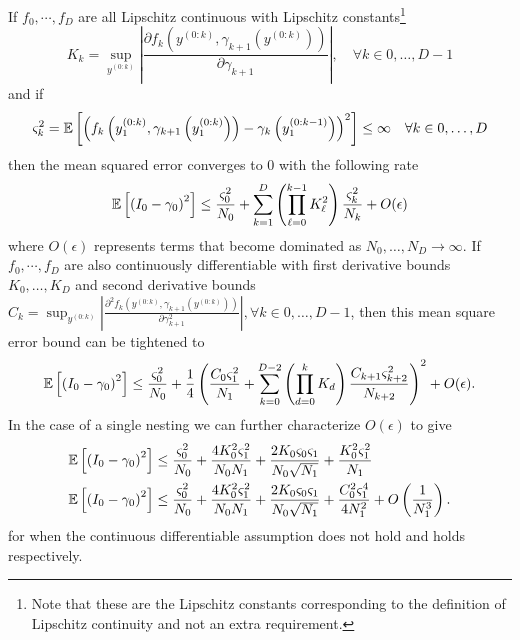 \begin{theorem}
  If $f_0, \cdots, f_D$ are all Lipschitz continuous with Lipschitz 
  constants\footnote{Note that these are the Lipschitz constants corresponding to
  	the definition of Lipschitz continuity and not an extra requirement.}
  \[K_k = \sup_{y^{(0:k)}} \left| \frac{\partial f_k\left(y^{(0:k)},\gamma_{k+1}(y^{(0:k)})\right)}{\partial \gamma_{k+1}}\right|, \quad \forall k
  \in 0,\dots,D-1
  \]
  and if 
    \[
    \varsigma_{k}^2  
    =\mathbb{E} \left[\left(f_k\left(y_1^{(0:k)},\gamma_{k+1}
    \left(y_1^{(0:k)}\right) \right)-\gamma_k\left(y_1^{(0:k-1)}\right)\right)^2\right] \le \infty \quad \forall k\in 0,\dots,D
    \]
  then the mean squared error converges to $0$ with the following rate
  \begin{align}
  \label{eq:bound-lip}
  \mathbb{E} \left[\left(I_0 - \gamma_0\right)^2\right] \le
  \frac{\varsigma_{0}^2}{N_0} +
  \sum_{k=1}^{D} \left(\prod_{\ell=0}^{k-1} K_{\ell}^2\right)
  \frac{\varsigma_{k}^2}{N_{k}}+ O(\epsilon)
  \end{align}
  where $O(\epsilon)$ represents terms that become dominated as $N_0,\dots,N_D
  \rightarrow \infty$.
  If $f_0, \cdots, f_D$ are also continuously differentiable with first derivative bounds
  $K_0, \dots, K_D$ and second derivative bounds 
  $C_k = \sup_{y^{(0:k)}} \left|\frac{\partial^2 f_k\left(y^{(0:k)},\gamma_{k+1}(y^{(0:k)})\right)}{\partial \gamma^2_{k+1}}\right|, \forall k
  \in 0,\dots,D-1$, then this mean square error bound can be tightened to
  \begin{align}
  \label{eq:bound-cont}
  \mathbb{E} \left[\left(I_0 - \gamma_0\right)^2\right] \le 
  \frac{\varsigma_0^2}{N_0}
  +\frac{1}{4}\left(
  \frac{C_0 \varsigma_{1}^2}{N_{1}}
  +\sum_{k=0}^{D-2}  \left(\prod_{d=0}^{k} K_{d}\right)
  \frac{C_{k+1} \varsigma^2_{k+2}}{N_{k+2}}
  \right)^2 + O(\epsilon).
  \end{align}
  In the case of a single nesting we can further characterize $O(\epsilon)$ to give
  \begin{align}
  \mathbb{E} \left[\left(I_0 - \gamma_0\right)^2\right]  &\le \frac{\varsigma^2_0}{N_0}+\frac{4 K_{0}^2 \varsigma_1^2}{N_0 N_{1}}
  +\frac{2 K_{0}\varsigma_{0} \varsigma_1}{N_{0} \sqrt{N_1}}+\frac{K_0 ^2 \varsigma_1^2}{N_1} \\
  \mathbb{E} \left[\left(I_0 - \gamma_0\right)^2\right]  &\le \frac{\varsigma^2_0}{N_0}+\frac{4 K_{0}^2 \varsigma_1^2}{N_0 N_{1}}
  +\frac{2 K_{0}\varsigma_{0} \varsigma_1}{N_{0} \sqrt{N_1}}+\frac{C_0 ^2 \varsigma_1^4}{4 N_1^2}
  + O\left(\frac{1}{N_1^{3}}\right).
  \end{align}
  for when the continuous differentiable assumption does not hold and 
  holds respectively.
\end{theorem}
